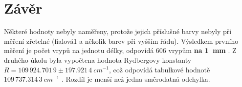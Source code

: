 \documentclass[10pt]{article}
\begin{document}
\section{Závěr}
Některé hodnoty nebyly naměřeny, protože jejich příslušné barvy nebyly
při měření zřetelné (fialová1 a několik barev při vyšším řádu).
Výsledkem prvního měření je počet vrypů na jednotu délky, odpovídá
{\boldmath $606$ }vrypům {\bf na 1~mm }. Z druhého úkolu byla vypočtena hodnota 
Rydbergovy konstanty {\boldmath $R = 109\,924.701\,9\pm197.921\,4~cm^{-1}$}, 
což odpovídá tabulkové hodnotě $109\,737.314\,3~cm^{-1}$ . Rozdíl je menší
než jedna směrodatná odchylka.
\end{document}
